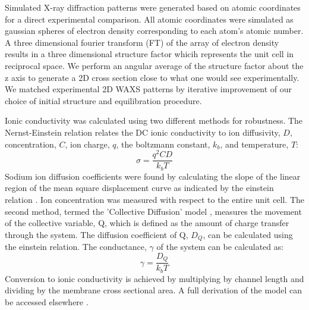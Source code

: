 
Simulated X-ray diffraction patterns were generated based on atomic
coordinates for a direct experimental comparison. All atomic coordinates
were simulated as gaussian spheres of electron density corresponding to
each atom's atomic number. A three dimensional fourier transform 
(FT) of the array of electron density results in a three dimensional structure
factor whicih represents the unit cell in reciprocal space. We perform an
angular average of the structure factor about the z axis to generate a
2D cross section close to what one would see experimentally. We matched 
experimental 2D WAXS patterns by iterative improvement of our choice of 
initial structure and equilibration procedure. 

Ionic conductivity was calculated using two different methods for
robustness. The Nernst-Einstein relation relates 
the DC ionic conductivity to ion diffusivity, $D$, concentration,
$C$, ion charge, $q$, the boltzmann constant, $k_b$, and temperature,
$T$: $$\sigma = \dfrac{q^2CD}{k_b T}$$ Sodium ion diffusion 
coefficients were found by calculating the slope of the linear
region of the mean square displacement curve as indicated by the
einstein relation \cite{einstein_investigations_1956}. Ion concentration
was measured with respect to the entire unit cell. The second method, 
termed the 'Collective Diffusion' model \cite{liu_collective_2013}, 
measures the movement of the collective variable, Q, which is defined as
the amount of charge transfer through the system. The diffusion 
coefficient of Q, $D_Q$, can be calculated using the einstein relation.
The conductance, $\gamma$ of the system can be calculated as:
$$ \gamma = \dfrac{D_Q}{k_b T} $$ Conversion to ionic conductivity is
achieved by multiplying by channel length and dividing by the membrane
cross sectional area. A full derivation of the model can be accessed 
elsewhere \cite{liu_collective_2013}.  

